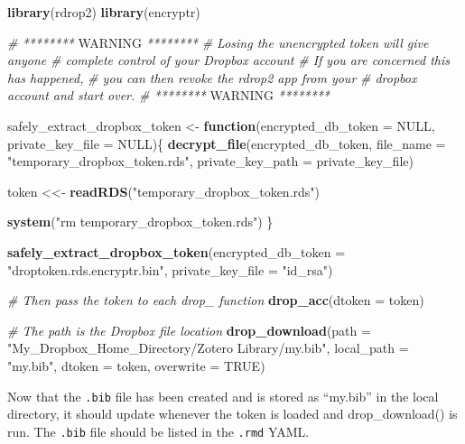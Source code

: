 \documentclass[
]{book}
\newenvironment{Shaded}{\begin{snugshade}}{\end{snugshade}}
\newcommand{\AlertTok}[1]{\textcolor[rgb]{0.94,0.16,0.16}{#1}}
\newcommand{\CommentTok}[1]{\textcolor[rgb]{0.56,0.35,0.01}{\textit{#1}}}
\newcommand{\ControlFlowTok}[1]{\textcolor[rgb]{0.13,0.29,0.53}{\textbf{#1}}}
\newcommand{\DataTypeTok}[1]{\textcolor[rgb]{0.13,0.29,0.53}{#1}}
\newcommand{\KeywordTok}[1]{\textcolor[rgb]{0.13,0.29,0.53}{\textbf{#1}}}
\newcommand{\NormalTok}[1]{#1}
\newcommand{\OtherTok}[1]{\textcolor[rgb]{0.56,0.35,0.01}{#1}}
\newcommand{\StringTok}[1]{\textcolor[rgb]{0.31,0.60,0.02}{#1}}
\begin{document}
\begin{Shaded}
\begin{Highlighting}[]
\KeywordTok{library}\NormalTok{(rdrop2)}
\KeywordTok{library}\NormalTok{(encryptr)}
 
\CommentTok{# ******** }\AlertTok{WARNING}\CommentTok{ ********}
\CommentTok{# Losing the unencrypted token will give anyone }
\CommentTok{# complete control of your Dropbox account}
\CommentTok{# If you are concerned this has happened,}
\CommentTok{# you can then revoke the rdrop2 app from your}
\CommentTok{# dropbox account and start over.}
\CommentTok{# ******** }\AlertTok{WARNING}\CommentTok{ ********}
 
 
\NormalTok{safely_extract_dropbox_token <-}\StringTok{ }\ControlFlowTok{function}\NormalTok{(}\DataTypeTok{encrypted_db_token =} \OtherTok{NULL}\NormalTok{, }
                                         \DataTypeTok{private_key_file =} \OtherTok{NULL}\NormalTok{)\{}
  \KeywordTok{decrypt_file}\NormalTok{(encrypted_db_token, }
               \DataTypeTok{file_name =} \StringTok{"temporary_dropbox_token.rds"}\NormalTok{, }
               \DataTypeTok{private_key_path =}\NormalTok{ private_key_file)}
  
\NormalTok{  token <<-}\StringTok{ }\KeywordTok{readRDS}\NormalTok{(}\StringTok{"temporary_dropbox_token.rds"}\NormalTok{)}
  
  \KeywordTok{system}\NormalTok{(}\StringTok{"rm temporary_dropbox_token.rds"}\NormalTok{)}
\NormalTok{\}}
 
\KeywordTok{safely_extract_dropbox_token}\NormalTok{(}\DataTypeTok{encrypted_db_token =} \StringTok{"droptoken.rds.encryptr.bin"}\NormalTok{, }
                             \DataTypeTok{private_key_file =} \StringTok{"id_rsa"}\NormalTok{)}
 
\CommentTok{# Then pass the token to each drop_ function}
\KeywordTok{drop_acc}\NormalTok{(}\DataTypeTok{dtoken =}\NormalTok{ token)}
 
\CommentTok{# The path is the Dropbox file location}
\KeywordTok{drop_download}\NormalTok{(}\DataTypeTok{path =} \StringTok{"My_Dropbox_Home_Directory/Zotero Library/my.bib"}\NormalTok{, }
              \DataTypeTok{local_path =} \StringTok{"my.bib"}\NormalTok{, }
              \DataTypeTok{dtoken =}\NormalTok{ token,}
              \DataTypeTok{overwrite =} \OtherTok{TRUE}\NormalTok{)}
\end{Highlighting}
\end{Shaded}

Now that the \texttt{.bib} file has been created and is stored as ``my.bib'' in the local directory, it should update whenever the token is loaded and drop\_download() is run. The \texttt{.bib} file should be listed in the \texttt{.rmd} YAML.
\end{document}
